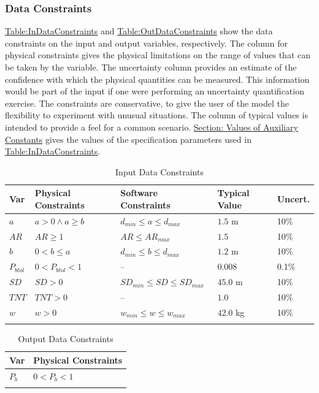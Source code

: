 \documentclass[12pt]{article}
\begin{document}
\subsubsection{Data Constraints}
\label{Sec:DataConstraints}
\hyperref[Table:InDataConstraints]{Table:InDataConstraints} and \hyperref[Table:OutDataConstraints]{Table:OutDataConstraints} show the data constraints on the input and output variables, respectively. The column for physical constraints gives the physical limitations on the range of values that can be taken by the variable. The uncertainty column provides an estimate of the confidence with which the physical quantities can be measured. This information would be part of the input if one were performing an uncertainty quantification exercise. The constraints are conservative, to give the user of the model the flexibility to experiment with unusual situations. The column of typical values is intended to provide a feel for a common scenario. \hyperref[Sec:AuxConstants]{Section: Values of Auxiliary Constants} gives the values of the specification parameters used in \hyperref[Table:InDataConstraints]{Table:InDataConstraints}.
\begin{longtable}{l l l l l}
\toprule
Var & Physical Constraints & Software Constraints & Typical Value & Uncert.
\\
\midrule
\endhead
$a$ & $a>0\land{}a\geq{}b$ & ${d_{min}}\leq{}a\leq{}{d_{max}}$ & $1.5$ m & 10$\%$
\\
$AR$ & $AR\geq{}1$ & $AR\leq{}{AR_{max}}$ & $1.5$ & 10$\%$
\\
$b$ & $0<b\leq{}a$ & ${d_{min}}\leq{}b\leq{}{d_{max}}$ & $1.2$ m & 10$\%$
\\
${P_{btol}}$ & $0<{P_{btol}}<1$ & -- & $0.008$ & 0.1$\%$
\\
$SD$ & $SD>0$ & ${SD_{min}}\leq{}SD\leq{}{SD_{max}}$ & $45.0$ m & 10$\%$
\\
$TNT$ & $TNT>0$ & -- & $1.0$ & 10$\%$
\\
$w$ & $w>0$ & ${w_{min}}\leq{}w\leq{}{w_{max}}$ & $42.0$ kg & 10$\%$
\\
\bottomrule
\caption{Input Data Constraints}
\label{Table:InDataConstraints}
\end{longtable}
\begin{longtable}{l l}
\toprule
Var & Physical Constraints
\\
\midrule
\endhead
${P_{b}}$ & $0<{P_{b}}<1$
\\
\bottomrule
\caption{Output Data Constraints}
\label{Table:OutDataConstraints}
\end{longtable}
\end{document}
